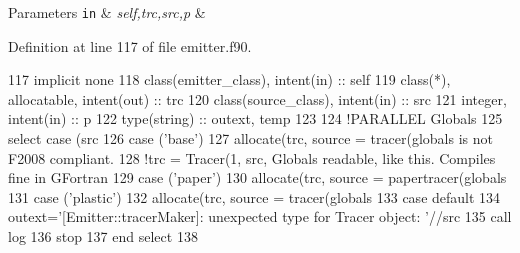 \begin{DoxyParams}[1]{Parameters}
\mbox{\tt in}  & {\em self,trc,src,p} & \\
\hline
\end{DoxyParams}


Definition at line 117 of file emitter.\+f90.


\begin{DoxyCode}
117     \textcolor{keywordtype}{implicit none}
118     \textcolor{keywordtype}{class}(emitter\_class), \textcolor{keywordtype}{intent(in)} :: self
119     \textcolor{keywordtype}{class}(*), \textcolor{keywordtype}{allocatable}, \textcolor{keywordtype}{intent(out)} :: trc
120     \textcolor{keywordtype}{class}(source\_class), \textcolor{keywordtype}{intent(in)} :: src
121     \textcolor{keywordtype}{integer}, \textcolor{keywordtype}{intent(in)} :: p
122     \textcolor{keywordtype}{type}(string) :: outext, temp
123 
124     \textcolor{comment}{!PARALLEL Globals%
125     \textcolor{keywordflow}{select case} (src%
126     \textcolor{keywordflow}{case} (\textcolor{stringliteral}{'base'})
127         \textcolor{keyword}{allocate}(trc, source = tracer(globals%
       is not F2008 compliant.}
128         \textcolor{comment}{!trc = Tracer(1, src, Globals%
       readable, like this. Compiles fine in GFortran}
129     \textcolor{keywordflow}{case} (\textcolor{stringliteral}{'paper'})
130         \textcolor{keyword}{allocate}(trc, source = papertracer(globals%
131     \textcolor{keywordflow}{case} (\textcolor{stringliteral}{'plastic'})
132         \textcolor{keyword}{allocate}(trc, source = tracer(globals%
133 \textcolor{keywordflow}{        case default}
134         outext=\textcolor{stringliteral}{'[Emitter::tracerMaker]: unexpected type for Tracer object: '}//src%
135         \textcolor{keyword}{call }log%
136         stop
137 \textcolor{keywordflow}{    end select}
138 
\end{DoxyCode}
